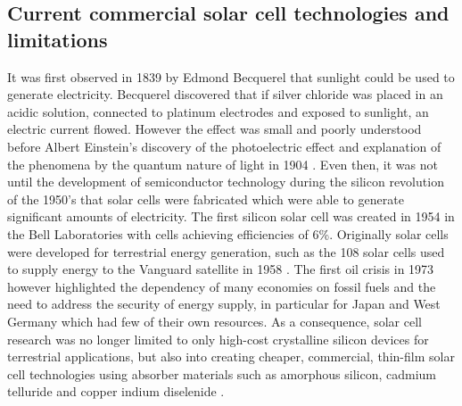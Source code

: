 \documentclass[11pt, twoside]{report}
\begin{document}


\subsection{Current commercial solar cell technologies and limitations}\label{current_tech}
It was first observed in 1839 by Edmond Becquerel that sunlight could be used to generate electricity. Becquerel discovered that if  silver chloride was placed in an acidic solution, connected to platinum electrodes and exposed to sunlight, an electric current flowed. However the effect was small and poorly understood before Albert Einstein's discovery of the photoelectric effect and explanation of the phenomena by the quantum nature of light in 1904 \cite{PV_history1}. Even then, it was not until the development of semiconductor technology during the silicon revolution of the 1950's that solar cells were fabricated which were able to generate significant amounts of electricity. The first silicon solar cell was created in 1954 in the Bell Laboratories with cells achieving efficiencies of 6\%. 
Originally solar cells were developed for terrestrial energy generation, such as the 108 solar cells used to supply energy to the Vanguard satellite in 1958 \cite{PV_history1}. The first oil crisis in 1973 however highlighted the dependency of many economies on fossil fuels and the need to address the security of energy supply,  in particular for Japan and West Germany which had few of their own resources. As a consequence, solar cell research was no longer limited to only high-cost crystalline silicon devices for terrestrial applications, but also into creating cheaper, commercial, thin-film solar cell technologies using absorber materials such as amorphous silicon, cadmium telluride and copper indium diselenide  \cite{PV_history2}.
\end{document}
